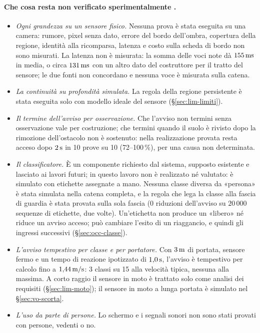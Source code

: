 \paragraph{Che cosa resta non verificato sperimentalmente .}
\begin{itemize}
\item \emph{Ogni grandezza su un sensore fisico.} Nessuna prova è stata eseguita su una camera: rumore, pixel senza dato, errore del bordo dell'ombra, copertura della regione, identità alla ricomparsa, latenza e costo sulla scheda di bordo non sono misurati. La latenza non è misurata: la somma delle voci note dà $155\,\mathrm{ms}$ in media, o circa $131\,\mathrm{ms}$ con un altro dato del costruttore per il tratto del sensore; le due fonti non concordano e nessuna voce è misurata sulla catena.
\item \emph{La continuità su profondità simulata.} La regola della regione persistente è stata eseguita solo con modello ideale del sensore (\S\ref{sec:lim-limiti}).
\item \emph{Il termine dell'avviso per osservazione.} Che l'avviso non termini senza osservazione vale per costruzione; che termini quando il suolo è rivisto dopo la rimozione dell'ostacolo non è sostenuto: nella realizzazione provata resta acceso dopo $2\,\mathrm{s}$ in 10 prove su 10 (72--100\,\%), per una causa non determinata.
\item \emph{Il classificatore.} È un componente richiesto dal sistema, supposto esistente e lasciato ai lavori futuri; in questo lavoro non è realizzato né valutato: è simulato con etichette assegnate a mano. Nessuna classe diversa da «persona» è stata simulata nella catena completa, e la regola che lega la classe alla fascia di guardia è stata provata sulla sola fascia (0 riduzioni dell'avviso su $20\,000$ sequenze di etichette, due volte). Un'etichetta non produce un «libero» né riduce un avviso acceso; può cambiare l'esito di un riaggancio, e quindi gli ingressi successivi (\S\ref{sec:occ-classe}).
\item \emph{L'avviso tempestivo per classe e per portatore.} Con $3\,\mathrm{m}$ di portata, sensore fermo e un tempo di reazione ipotizzato di $1{,}0\,\mathrm{s}$, l'avviso è tempestivo per calcolo fino a $1{,}44\,\mathrm{m/s}$: 3 classi su 15 alla velocità tipica, nessuna alla massima. A corto raggio il sensore in moto è trattato solo come analisi dei requisiti (\S\ref{sec:lim-moto}); il sensore in moto a lunga portata è simulato nel \S\ref{sec:vo-scorta}.
\item \emph{L'uso da parte di persone.} Lo schermo e i segnali sonori non sono stati provati con persone, vedenti o no.
\end{itemize}

